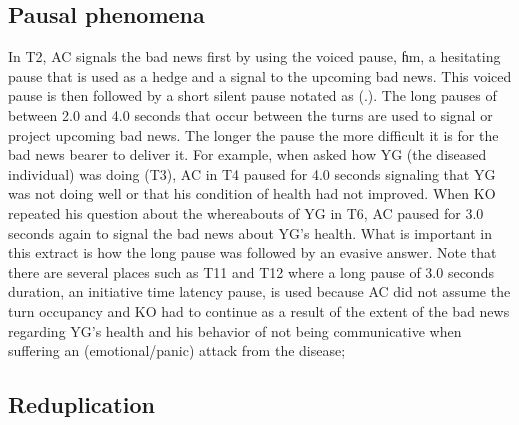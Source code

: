 \documentclass[output=paper,colorlinks,citecolor=brown]{langscibook}
\begin{document}
\subsection{Pausal phenomena}\label{sec:obeng:4.3}

In T2, AC signals the bad news first by using the voiced pause, ɦm, a hesitating pause that is used as a hedge and a signal to the upcoming bad news. This voiced pause is then followed by a short silent pause notated as (.). The long pauses of between 2.0 and 4.0 seconds that occur between the turns are used to signal or project upcoming bad news. The longer the pause the more difficult it is for the bad news bearer to deliver it. For example, when asked how YG (the diseased individual) was doing (T3), AC in T4 paused for 4.0 seconds signaling that YG was not doing well or that his condition of health had not improved. When KO repeated his question about the whereabouts of YG in T6, AC paused for 3.0 seconds again to signal the bad news about YG’s health. What is important in this extract is how the long pause was followed by an evasive answer. Note that there are several places such as T11 and T12 where a long pause of 3.0 seconds duration, an initiative time latency pause, is used because AC did not assume the turn occupancy and KO had to continue as a result of the extent of the bad news regarding YG’s health and his behavior of not being communicative when suffering an (emotional/panic) attack from the disease;

\subsection{Reduplication}\label{sec:obeng:4.4}
\end{document}

